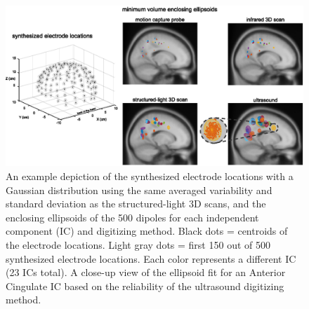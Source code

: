 \documentclass{UCF_ETD}
\begin{document}
\begin{figure}[h!]
    \centering
    \includegraphics{img/result4.eps}
    \caption{An example depiction of the synthesized electrode locations with a Gaussian distribution using the same averaged variability and standard deviation as the structured-light 3D scans, and the enclosing ellipsoids of the 500 dipoles for each independent component (IC) and digitizing method. Black dots = centroids of the electrode locations. Light gray dots = first 150 out of 500 synthesized electrode locations. Each color represents a different IC (23 ICs total). A close-up view of the ellipsoid fit for an Anterior Cingulate IC based on the reliability of the ultrasound digitizing method.}
    \label{fig:r4}
\end{figure}
\end{document}
